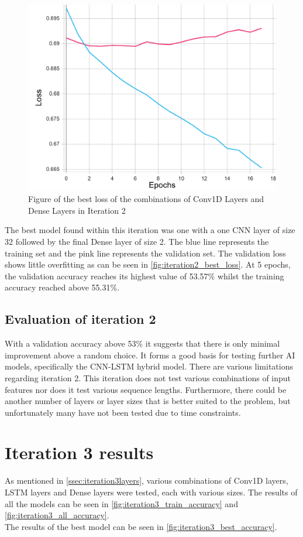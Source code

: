 \begin{figure}[ht]
    \centering
    \includegraphics[width=0.95\columnwidth]{figures/results/cnn/cnn_1C32-1D64_loss.pdf}
    \caption[Best loss for Iteration 2]{Figure of the best loss of the combinations of Conv1D Layers and Dense Layers in Iteration 2}
    \label{fig:iteration2_best_loss}
\end{figure}
\FloatBarrier

The best model found within this iteration was one with a one CNN layer of size 32 followed
by the final Dense layer of size 2. The blue line represents the training set and the pink line represents
the validation set. The validation loss shows little overfitting as can be seen in
\autoref{fig:iteration2_best_loss}. At 5 epochs, the validation accuracy reaches its highest value of
53.57\% whilst the training accuracy reached above 55.31\%.
\subsection{Evaluation of iteration 2}
With a validation accuracy above 53\% it suggests that there is only minimal improvement above a random choice. It forms a good
basis for testing further AI models, specifically the CNN-LSTM hybrid model.
There are various limitations regarding iteration 2. This iteration does not test various combinations of
input features nor does it test various sequence lengths. Furthermore, there could be another number of layers or
layer sizes that is better suited to the problem, but unfortunately many have not been tested due to time constraints.

\section{Iteration 3 results}
As mentioned in \autoref{ssec:iteration3layers}, various combinations of Conv1D layers, LSTM layers and Dense layers were tested,
each with various sizes. The results of all the models can be seen in \autoref{fig:iteration3_train_accuracy}
and \autoref{fig:iteration3_all_accuracy}.\\
The results of the best model can be seen in \autoref{fig:iteration3_best_accuracy}.

